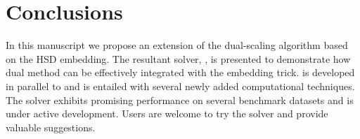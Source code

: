 \section{Conclusions}

In this manuscript we propose an extension of the dual-scaling algorithm based on
the HSD embedding. The resultant solver, , is presented to
demonstrate how dual method can be effectively integrated with the embedding
trick.  is developed in parallel to  and
is entailed with several newly added computational techniques. The solver
exhibits promising performance on several benchmark datasets and is under
active development. Users are welcome to try the solver and provide valuable suggestions.